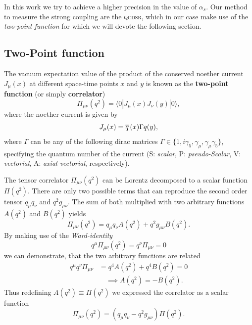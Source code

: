 \documentclass[../../index.tex]{subfiles}
\begin{document}
In this work we try to achieve a higher precision in the value of $\alpha_s$.
Our method to measure the strong coupling are the \textsc{qcdsr},
which in our case make use of the \textit{two-point function} for
which we will devote the following section.

\subsection{Two-Point function}
\label{sec:twoPointFunction}
The vacuum expectation value of the product of the conserved noether current
$J_\mu(x)$ at different space-time points $x$ and $y$ is known as the
\textbf{two-point function} (or simply \textbf{correlator})
\begin{equation}
  \label{eq:twoPointFunction}
  \Pi_{\mu\nu}(q^2) = \langle  0 | J_\mu(x) J_\nu(y) | 0 \rangle,
\end{equation}
where the noether current is given by
\begin{equation}
  \label{eq:qcdCurrent}
  J_\mu(x) = \overline{q}\,(x) \Gamma q(y),
\end{equation}
where $\Gamma$ can be any of the following dirac matrices $\Gamma \in \{ 1,
i\gamma_5, \gamma_\mu, \gamma_\mu\gamma_5\}$, specifying the quantum number of
the current (S: \textit{scalar}, P: \textit{pseudo-Scalar}, V:
\textit{vectorial}, A: \textit{axial-vectorial}, respectively).

The tensor correlator $\Pi_{\mu\nu}(q^2)$ can be Lorentz decomposed to a scalar
function $\Pi(q^2)$. There are only two possible terms that can reproduce the
second order tensor $q_\mu q_\nu$ and $q^2 g_{\mu\nu}$. The sum of both
multiplied with two arbitrary functions $A(q^2)$ and $B(q^2)$ yields
\begin{equation}
  \Pi_{\mu\nu}(q^2) = q_\mu q_\nu A(q^2) + q^2 g_{\mu\nu} B(q^2).
\end{equation}
By making use of the \textit{Ward-identity} \cite{Peskin1995}
\begin{equation}
  \label{eq:wardIdentity}
  q^\mu \Pi_{\mu\nu}(q^2) = q^\nu \Pi_{\mu\nu} = 0
\end{equation}
we can demonstrate, that the two arbitrary functions are related
\begin{equation}
  \begin{split}
    q^\mu q^\nu \Pi_{\mu\nu} &= q^4 A(q^2) + q^4 B(q^2) = 0 \\
    &\quad \implies A(q^2) = -B(q^2).
  \end{split}
\end{equation}
Thus redefining $A(q^2) \equiv \Pi(q^2)$ we expressed the correlator as a scalar
function
\begin{equation}
  \Pi_{\mu\nu}(q^2) = (q_\mu q_\nu - q^2 g_{\mu\nu})\Pi(q^2).
\end{equation}
\end{document}
